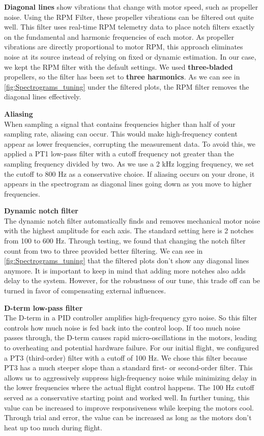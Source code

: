 \documentclass[a4paper,11pt]{scrartcl}
\begin{document}
\textbf{Diagonal lines} show vibrations that change with motor speed, such as propeller noise. Using the RPM Filter, these propeller vibrations can be filtered out quite well. This filter uses real-time RPM telemetry data to place notch filters exactly on the fundamental and harmonic frequencies of each motor. As propeller vibrations are directly proportional to motor RPM, this approach eliminates noise at its source instead of relying on fixed or dynamic estimation. In our case, we kept the RPM filter with the default settings. We used \textbf{three-bladed} propellers, so the filter has been set to \textbf{three harmonics}. As we can see in \autoref{fig:Spectrograms_tuning} under the filtered plots, the RPM filter removes the diagonal lines effectively.

\textbf{Aliasing}\\
When sampling a signal that contains frequencies higher than half of your sampling rate, aliasing can occur. This would make high-frequency content appear as lower frequencies, corrupting the measurement data. To avoid this, we applied a PT1 low-pass filter with a cutoff frequency not greater than the sampling frequency divided by two. As we use a 2 kHz logging frequency, we set the cutoff to 800 Hz as a conservative choice.
If aliasing occurs on your drone, it appears in the spectrogram as diagonal lines going down as you move to higher frequencies.

\textbf{Dynamic notch filter}\\
The dynamic notch filter automatically finds and removes mechanical motor noise with the highest amplitude for each axis. The standard setting here is 2 notches from 100 to 600 Hz. Through testing, we found that changing the notch filter count from two to three provided better filtering. We can see in \autoref{fig:Spectrograms_tuning} that the filtered plots don't show any diagonal lines anymore. It is important to keep in mind that adding more notches also adds delay to the system. However, for the robustness of our tune, this trade off can be turned in favor of compensating external influences.

\textbf{D-term low-pass filter}\\
The D-term in a PID controller amplifies high-frequency gyro noise. So this filter controls how much noise is fed back into the control loop. If too much noise passes through, the D-term causes rapid micro-oscillations in the motors, leading to overheating and potential hardware failure.
For our initial flight, we configured a PT3 (third-order) filter with a cutoff of 100 Hz. We chose this filter because PT3 has a much steeper slope than a standard first- or second-order filter. This allows us to aggressively suppress high-frequency noise while minimizing delay in the lower frequencies where the actual flight control happens. The 100 Hz cutoff served as a conservative starting point and worked well. In further tuning, this value can be increased to improve responsiveness while keeping the motors cool. Through trial and error, the value can be increased as long as the motors don't heat up too much during flight.
\end{document}
